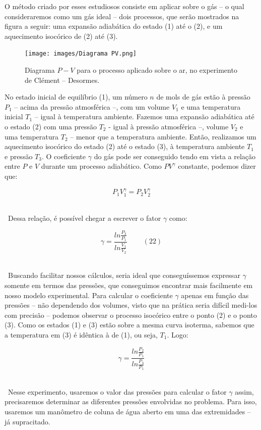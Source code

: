 O método criado por esses estudiosos consiste em aplicar sobre o gás – o qual consideraremos como um gás ideal – dois processos, que serão mostrados na figura a seguir: uma expansão adiabática do estado (1) até o (2), e um aquecimento isocórico de (2) até (3).\\

\begin{figure}[H]
  \centering
  \texttt{[image: images/Diagrama PV.png]}
  \caption{Diagrama $P-V$ para o processo aplicado sobre o ar, no experimento de Clément – Desormes.}
  \label{fig:processo-grafico}
\end{figure}

No estado inicial de equilíbrio (1), um número $n$ de mols de gás estão à pressão $P_1$ – acima da pressão atmosférica –, com um volume $V_1$ e uma temperatura inicial $T_1$ – igual à temperatura ambiente. Fazemos uma expansão adiabática até o estado (2) com uma pressão $T_2$ - igual à pressão atmosférica –, volume $V_2$ e uma temperatura $T_2$ – menor que a temperatura ambiente. Então, realizamos um aquecimento isocórico do estado (2) até o estado (3), à temperatura ambiente $T_1$ e pressão $T_3$.
O coeficiente $\gamma$ do gás pode ser conseguido tendo em vista a relação entre $P$ e $V$ durante um processo adiabático. Como $PV^\gamma$ constante, podemos dizer que:

\[ P_1V_1^\gamma =  P_2V_2^\gamma\]\

\ Dessa relação, é possível chegar a escrever o fator $\gamma$ como:

\[ \gamma = \frac{ln\frac{P_2}{P_1}}{ln\frac{V_1}{V_2}} \   \  \ \ \ \ \ \ \ \ (22)\]\

\ Buscando facilitar nossos cálculos, seria ideal que conseguíssemos expressar $\gamma$ somente em termos das pressões, que conseguimos encontrar mais facilmente em nosso modelo experimental. Para calcular o coeficiente $\gamma$ apenas em função das pressões – não dependendo dos volumes, visto que na prática seria difícil medi-los com precisão – podemos observar o processo isocórico entre o ponto (2) e o ponto (3). Como os estados (1) e (3) estão sobre a mesma curva isoterma, sabemos que a temperatura em (3) é idêntica à de (1), ou seja, $T_1$.\label{explicação-eq23} Logo:

\[ \gamma = \frac{ln\frac{P_2}{P_1}}{ln\frac{P_3}{P_1}}\] \

\ Nesse experimento, usaremos o valor das pressões para calcular o fator $\gamma$ assim, precisaremos determinar as diferentes pressões envolvidas no problema. Para isso, usaremos um manômetro de coluna de água aberto em uma das extremidades – já supracitado.\\


